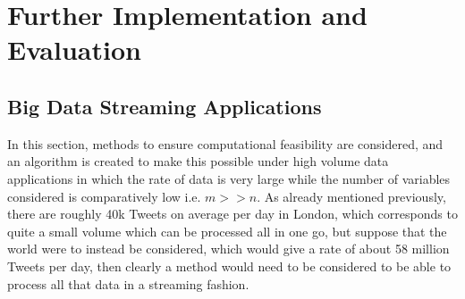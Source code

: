 \documentclass[11pt,a4paper]{article}
\begin{document}
\section{Further Implementation and Evaluation}

\subsection{Big Data Streaming Applications}
In this section, methods to ensure computational feasibility are considered, and an algorithm is created to make this possible under high volume data applications in which the rate of data is very large while the number of variables considered is comparatively low i.e. $m >> n$. As already mentioned previously, there are roughly 40k Tweets on average per day in London, which corresponds to quite a small volume which can be processed all in one go, but suppose that the world were to instead be considered, which would give a rate of about 58 million Tweets per day, then clearly a method would need to be considered to be able to process all that data in a streaming fashion. 
\end{document}
